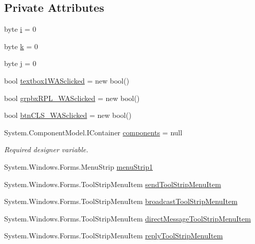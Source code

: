 \subsection*{\-Private \-Attributes}
\begin{DoxyCompactItemize}
\item 
byte \hyperlink{class_sr_p___classroom_inq_1_1_form1_a1b143fe38b39e80261a1a066026598f2}{i} = 0
\item 
byte \hyperlink{class_sr_p___classroom_inq_1_1_form1_afac3413b9df22d1eb1e9c466ef49d5c5}{k} = 0
\item 
byte \hyperlink{class_sr_p___classroom_inq_1_1_form1_a12371b97e1ace5625af631c234829cee}{j} = 0
\item 
bool \hyperlink{class_sr_p___classroom_inq_1_1_form1_abd63ca218d550d28baff3071b1c27483}{textbox1\-W\-A\-Sclicked} = new bool()
\item 
bool \hyperlink{class_sr_p___classroom_inq_1_1_form1_a8759913b0dd88900294c267195dd81ea}{grpbx\-R\-P\-L\-\_\-\-W\-A\-Sclicked} = new bool()
\item 
bool \hyperlink{class_sr_p___classroom_inq_1_1_form1_a262b78a24b801b386d3a5684a3145406}{btn\-C\-L\-S\-\_\-\-W\-A\-Sclicked} = new bool()
\item 
\-System.\-Component\-Model.\-I\-Container \hyperlink{class_sr_p___classroom_inq_1_1_form1_accb63125f3efaee7cf29bc694431d352}{components} = null
\begin{DoxyCompactList}\small\item\em \-Required designer variable. \end{DoxyCompactList}\item 
\-System.\-Windows.\-Forms.\-Menu\-Strip \hyperlink{class_sr_p___classroom_inq_1_1_form1_a96c0a67f69db0cb7d91c00ec20c57863}{menu\-Strip1}
\item 
\-System.\-Windows.\-Forms.\-Tool\-Strip\-Menu\-Item \hyperlink{class_sr_p___classroom_inq_1_1_form1_ad2d5fd561e0a7b9572cc591b7056f5c4}{send\-Tool\-Strip\-Menu\-Item}
\item 
\-System.\-Windows.\-Forms.\-Tool\-Strip\-Menu\-Item \hyperlink{class_sr_p___classroom_inq_1_1_form1_aa80b5939f28addc897e87c70462b022d}{broadcast\-Tool\-Strip\-Menu\-Item}
\item 
\-System.\-Windows.\-Forms.\-Tool\-Strip\-Menu\-Item \hyperlink{class_sr_p___classroom_inq_1_1_form1_ab3a4ceedac3b7ba0985ed1bf2d581848}{direct\-Message\-Tool\-Strip\-Menu\-Item}
\item 
\-System.\-Windows.\-Forms.\-Tool\-Strip\-Menu\-Item \hyperlink{class_sr_p___classroom_inq_1_1_form1_acc6ff110ce8c8a1171c0a1d30ca10a9c}{reply\-Tool\-Strip\-Menu\-Item}

\end{DoxyCompactItemize}
